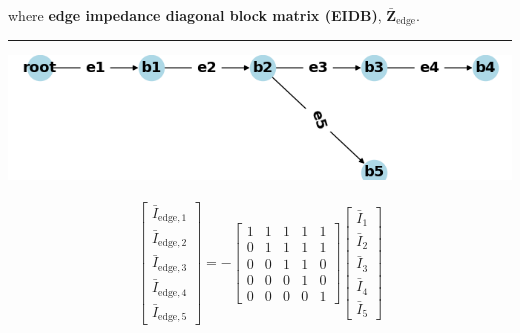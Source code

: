 \documentclass[
]{book}
\begin{document}
where \textbf{edge impedance diagonal block matrix (EIDB)},
\(\boldsymbol{\bar{Z}}_\text{edge}\).

\begin{center}\rule{0.5\linewidth}{0.5pt}\end{center}

\begin{center}\includegraphics[width=0.7\linewidth]{Pictures/figCaseSix} \end{center}

\[ \begin{aligned}
    \left[\begin{array}{l}
    \bar{I}_{\text{edge}, 1} \\
    \bar{I}_{\text{edge}, 2} \\
    \bar{I}_{\text{edge}, 3} \\
    \bar{I}_{\text{edge}, 4} \\
    \bar{I}_{\text{edge}, 5}
    \end{array}\right]
    = - \left[\begin{array}{lllll}
    1 & 1 & 1 & 1 & 1 \\
    0 & 1 & 1 & 1 & 1 \\
    0 & 0 & 1 & 1 & 0 \\
    0 & 0 & 0 & 1 & 0 \\
    0 & 0 & 0 & 0 & 1
    \end{array}\right]
    \left[\begin{array}{l}
    \bar{I}_{1} \\
    \bar{I}_{2} \\
    \bar{I}_{3} \\
    \bar{I}_{4} \\
    \bar{I}_{5}
    \end{array}\right]
\end{aligned} \]
\end{document}
